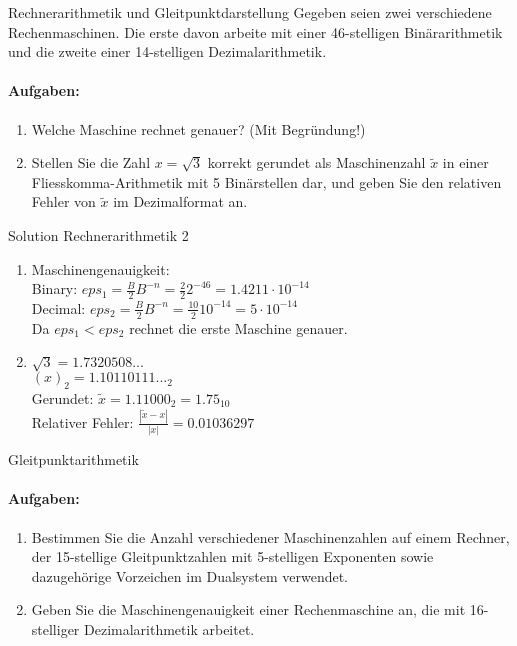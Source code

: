 \begin{example2}{Rechnerarithmetik und Gleitpunktdarstellung}
Gegeben seien zwei verschiedene Rechenmaschinen. Die erste davon arbeite mit einer 46-stelligen Binärarithmetik und die zweite einer 14-stelligen Dezimalarithmetik.

\paragraph{Aufgaben:}
\begin{enumerate}
    \item Welche Maschine rechnet genauer? (Mit Begründung!)
    \item Stellen Sie die Zahl $x = \sqrt{3}$ korrekt gerundet als Maschinenzahl $\tilde{x}$ in einer Fliesskomma-Arithmetik mit 5 Binärstellen dar, und geben Sie den relativen Fehler von $\tilde{x}$ im Dezimalformat an.
\end{enumerate}
\end{example2}

\begin{KR}{Solution Rechnerarithmetik 2} 
\begin{enumerate}
    \item Maschinengenauigkeit:\\
    Binary: $eps_1 = \frac{B}{2}B^{-n} = \frac{2}{2}2^{-46} = 1.4211 \cdot 10^{-14}$\\
    Decimal: $eps_2 = \frac{B}{2}B^{-n} = \frac{10}{2}10^{-14} = 5 \cdot 10^{-14}$\\
    Da $eps_1 < eps_2$ rechnet die erste Maschine genauer.

    \item $\sqrt{3} = 1.7320508...$\\
    $(x)_2 = 1.10110111..._2$\\
    Gerundet: $\tilde{x} = 1.11000_2 = 1.75_{10}$\\
    Relativer Fehler: $\frac{|\tilde{x}-x|}{|x|} = 0.01036297$
\end{enumerate}
\end{KR}

\begin{example2}{Gleitpunktarithmetik}
\paragraph{Aufgaben:}
\begin{enumerate}
    \item Bestimmen Sie die Anzahl verschiedener Maschinenzahlen auf einem Rechner, der 15-stellige Gleitpunktzahlen mit 5-stelligen Exponenten sowie dazugehörige Vorzeichen im Dualsystem verwendet.
    
    \item Geben Sie die Maschinengenauigkeit einer Rechenmaschine an, die mit 16-stelliger Dezimalarithmetik arbeitet.
\end{enumerate}
\end{example2}

